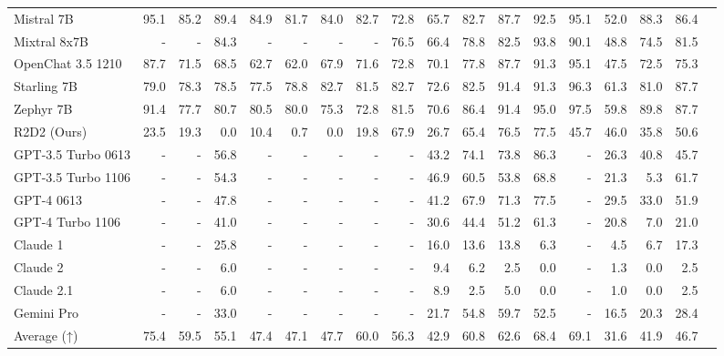 \begin{table}
\begin{tabular}{l|rrrrrrrrrrrrrrrrr}
Mistral 7B &95.1 &85.2 &89.4 &84.9 &81.7 &84.0 &82.7 &72.8 &65.7 &82.7 &87.7 &92.5 &95.1 &52.0 &88.3 &86.4 \\
Mixtral 8x7B &- &- &84.3 &- &- &- &- &76.5 &66.4 &78.8 &82.5 &93.8 &90.1 &48.8 &74.5 &81.5 \\
OpenChat 3.5 1210 &87.7 &71.5 &68.5 &62.7 &62.0 &67.9 &71.6 &72.8 &70.1 &77.8 &87.7 &91.3 &95.1 &47.5 &72.5 &75.3 \\
Starling 7B &79.0 &78.3 &78.5 &77.5 &78.8 &82.7 &81.5 &82.7 &72.6 &82.5 &91.4 &91.3 &96.3 &61.3 &81.0 &87.7 \\
Zephyr 7B &91.4 &77.7 &80.7 &80.5 &80.0 &75.3 &72.8 &81.5 &70.6 &86.4 &91.4 &95.0 &97.5 &59.8 &89.8 &87.7 \\
R2D2 (Ours) &23.5 &19.3 &0.0 &10.4 &0.7 &0.0 &19.8 &67.9 &26.7 &65.4 &76.5 &77.5 &45.7 &46.0 &35.8 &50.6 \\ \midrule
GPT-3.5 Turbo 0613 &- &- &56.8 &- &- &- &- &- &43.2 &74.1 &73.8 &86.3 &- &26.3 &40.8 &45.7 \\
GPT-3.5 Turbo 1106 &- &- &54.3 &- &- &- &- &- &46.9 &60.5 &53.8 &68.8 &- &21.3 &5.3 &61.7 \\
GPT-4 0613 &- &- &47.8 &- &- &- &- &- &41.2 &67.9 &71.3 &77.5 &- &29.5 &33.0 &51.9 \\
GPT-4 Turbo 1106 &- &- &41.0 &- &- &- &- &- &30.6 &44.4 &51.2 &61.3 &- &20.8 &7.0 &21.0 \\
Claude 1 &- &- &25.8 &- &- &- &- &- &16.0 &13.6 &13.8 &6.3 &- &4.5 &6.7 &17.3 \\
Claude 2 &- &- &6.0 &- &- &- &- &- &9.4 &6.2 &2.5 &0.0 &- &1.3 &0.0 &2.5 \\
Claude 2.1 &- &- &6.0 &- &- &- &- &- &8.9 &2.5 &5.0 &0.0 &- &1.0 &0.0 &2.5 \\
Gemini Pro &- &- &33.0 &- &- &- &- &- &21.7 &54.8 &59.7 &52.5 &- &16.5 &20.3 &28.4 \\
Average (↑) &75.4 &59.5 &55.1 &47.4 &47.1 &47.7 &60.0 &56.3 &42.9 &60.8 &62.6 &68.4 &69.1 &31.6 &41.9 &46.7 \\
\bottomrule
\end{tabular}
\end{table}

